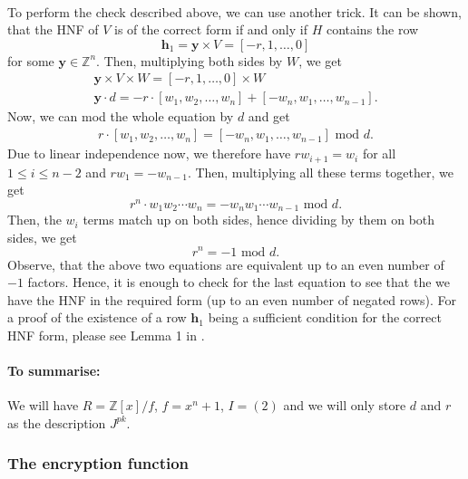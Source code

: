 \documentclass{article}
\theoremstyle{definition}
\theoremstyle{example}
\newcommand{\Int}{\mathbb{Z}}
\renewcommand{\mod}{\,\,\text{mod}\,\,}
\renewcommand{\vec}[1]{\mathbf{#1}}
\begin{document}
\paragraph{} To perform the check described above, we can use another trick. It
can be shown, that the HNF of $V$ is of the correct form if and only if $H$
contains the row 
\[
  \vec{h}_1 = \vec{y} \times V = [-r, 1, \hdots, 0]
\]
for some $\vec{y} \in \Int^n$. Then, multiplying both sides by $W$, we get
\begin{gather*}
  \vec{y} \times V \times W = [-r, 1, \hdots, 0] \times W \\
  \vec{y} \cdot d = -r \cdot [w_1, w_2, \hdots, w_n] + [-w_n, w_1, \hdots, w_{n-1}]. 
\end{gather*}
Now, we can mod the whole equation by $d$ and get
\begin{gather*}
  r \cdot [w_1, w_2, \hdots, w_n] = [-w_n, w_1, \hdots, w_{n-1}] \mod d.
\end{gather*}
Due to linear independence now, we therefore have $rw_{i+1} = w_i$ for all $1
\leq i \leq n - 2$ and $rw_1 = -w_{n - 1}$. Then, multiplying all these terms
together, we get
\[
  r^n\cdot w_1w_2\cdots w_n = -w_nw_1\cdots w_{n-1} \mod d.
\]
Then, the $w_i$ terms match up on both sides, hence dividing by them on both
sides, we get
\[
  r^n = -1 \mod d.
\]
Observe, that the above two equations are equivalent up to an even number of
$-1$ factors. Hence, it is enough to check for the last equation to see that the
we have the HNF in the required form (up to an even number of negated rows). For
a proof of the existence of a row $\vec{h}_1$ being a sufficient condition for
the correct HNF form, please see Lemma 1 in \cite{gentryImplementation}.
\paragraph{To summarise:} We will have $R = \Int[x]/f$, $f = x^n + 1$, $I =
(2)$ and we will only store $d$ and $r$ as the description $J^{pk}$.
\subsubsection{The encryption function}
\end{document}
